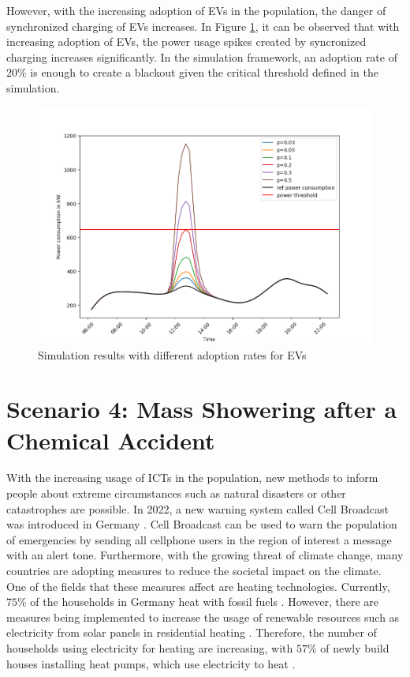 However, with the increasing adoption of EVs in the 
population, the danger of synchronized charging 
of EVs increases. In Figure \ref{thirdscenarioresultsdiffadoption},
it can be observed that with increasing adoption of EVs,
the power usage spikes created by syncronized charging 
increases significantly. In the simulation framework,
an adoption rate of $20\%$ is enough to create a 
blackout given the critical threshold 
defined in the simulation.

\begin{figure}[!ht]
    \center
    \includegraphics[scale=.5]{figs/eval/scenario3/changingadoption.png}
    \caption{Simulation results with different adoption rates for EVs}
    \label{thirdscenarioresultsdiffadoption}
\end{figure}

\section{Scenario 4: Mass Showering after a Chemical Accident}
\label{scenario4total}

With the increasing usage of ICTs in the population,
new methods to inform people about extreme circumstances
such as natural disasters or other catastrophes are possible. In 2022,
a new warning system called Cell Broadcast was introduced in Germany
\cite{TEAlert}. Cell Broadcast can be used to warn the population
of emergencies by sending all cellphone users in the 
region of interest a message with an alert tone.
Furthermore, with the growing threat of climate change, many countries
are adopting measures to reduce the societal impact on the
climate. One of the fields that these measures affect 
are heating technologies. Currently, $75\%$ of the households 
in Germany heat with fossil fuels \cite{bdewhouhseholds}. 
However, there are measures being 
implemented to increase the usage of renewable resources such 
as electricity from solar panels in residential heating
\cite{heizungsgesetz}. Therefore, the number of households 
using electricity for heating are increasing, with 
$57\%$ of newly build houses installing 
heat pumps, which use electricity to heat
\cite{heatingpumps}.

